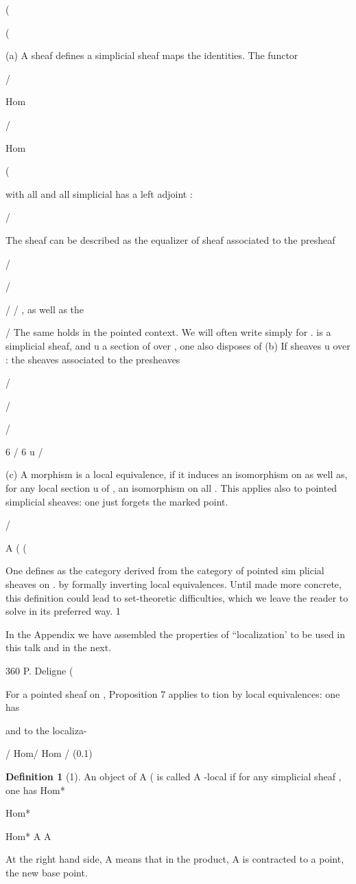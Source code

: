 \documentclass[11pt,a4paper]{article}
\theoremstyle{plain}
\theoremstyle{definition}
\newtheorem{definition}[theorem]{Definition}
\begin{document}
(



(

(a) A sheaf defines a simplicial sheaf
maps the identities. The functor 

/  

Hom

 / 

Hom

(

with all 
and all simplicial
has a left adjoint 
:

 /  

The sheaf
can be described as the equalizer of
sheaf associated to the presheaf

/

 / 

/ / , as well as the

   / 
The same holds in the pointed context. We will often write simply for .
is a simplicial sheaf, and u a section of
over , one also disposes of
(b) If
sheaves 
u over : the sheaves associated to the presheaves

/

 /  

/





6  / 6  u
/

(c) A morphism
is a local equivalence, if it induces an isomorphism
on
as well as, for any local section u of , an isomorphism on all  . This
applies also to pointed simplicial sheaves: one just forgets the marked point.



/



A (
(

One defines
as the category derived from the category of pointed sim
plicial sheaves on
.   by formally inverting local equivalences. Until made
more concrete, this definition could lead to set-theoretic difficulties, which we leave
the reader to solve in its preferred way.
1

In the Appendix we have assembled the properties of ``localization' to be used in this talk and in
the next.

360
P. Deligne
(

For a pointed sheaf on
, Proposition 7 applies to
tion by local equivalences: one has

and to the localiza-

/   Hom/   Hom /  
(0.1)
\begin{definition}[1]
An object  of A ( is called A -local if for any simplicial
sheaf  , one has
Hom*

Hom*

   Hom*   A  A 



At the right hand side,  A means that in the product,   A is contracted to a
point, the new base point.
\end{definition}
\end{document}
